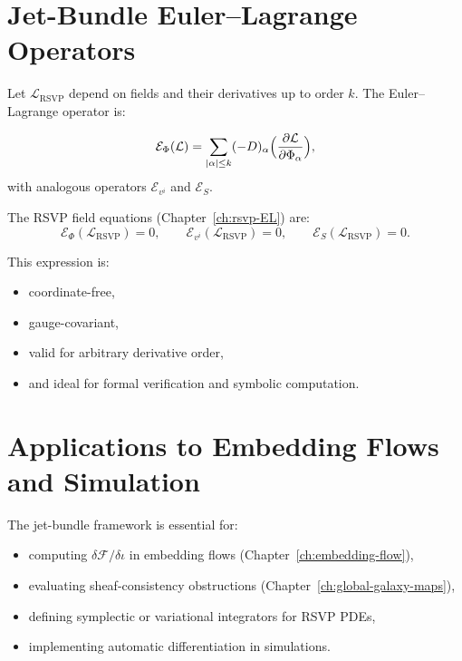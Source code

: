 \section{Jet-Bundle Euler--Lagrange Operators}

Let $\mathcal{L}_{\mathrm{RSVP}}$ depend on fields and their derivatives up to order $k$. The Euler–Lagrange operator is:

\begin{definition}
\[
\mathcal{E}_\Phi(\mathcal{L})
=
\sum_{|\alpha|\le k}
(-D)_\alpha
\Bigl(
\frac{\partial\mathcal{L}}{\partial \Phi_\alpha}
\Bigr),
\]
with analogous operators $\mathcal{E}_{v^i}$ and $\mathcal{E}_S$.
\end{definition}

The RSVP field equations (Chapter~\ref{ch:rsvp-EL}) are:
\[
\mathcal{E}_\Phi(\mathcal{L}_{\mathrm{RSVP}})=0,\qquad
\mathcal{E}_{v^i}(\mathcal{L}_{\mathrm{RSVP}})=0,\qquad
\mathcal{E}_S(\mathcal{L}_{\mathrm{RSVP}})=0.
\]

This expression is:
\begin{itemize}
\item coordinate-free,
\item gauge-covariant,
\item valid for arbitrary derivative order,
\item and ideal for formal verification and symbolic computation.
\end{itemize}

\section{Applications to Embedding Flows and Simulation}

The jet-bundle framework is essential for:

\begin{itemize}
\item computing $\delta\mathcal{F}/\delta\iota$ in embedding flows (Chapter~\ref{ch:embedding-flow}),
\item evaluating sheaf-consistency obstructions (Chapter~\ref{ch:global-galaxy-maps}),
\item defining symplectic or variational integrators for RSVP PDEs,
\item implementing automatic differentiation in simulations.
\end{itemize}

